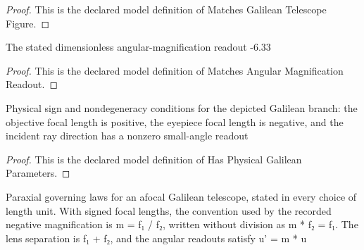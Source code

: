 \begin{proof}
  This is the declared model definition of Matches Galilean Telescope Figure.
\end{proof}
\begin{definition}
  \label{def:physics:phyx-mini-0111:phyxminiproblems-problemphyxmini0111-matchesangularmagnificationreadout}
  The stated dimensionless angular-magnification readout -6.33
\end{definition}
\begin{proof}
  This is the declared model definition of Matches Angular Magnification Readout.
\end{proof}
\begin{definition}
  \label{def:physics:phyx-mini-0111:phyxminiproblems-problemphyxmini0111-hasphysicalgalileanparameters}
  Physical sign and nondegeneracy conditions for the depicted Galilean branch: the objective focal length is positive, the eyepiece focal length is negative, and the incident ray direction has a nonzero small-angle readout
\end{definition}
\begin{proof}
  This is the declared model definition of Has Physical Galilean Parameters.
\end{proof}
\begin{definition}
  \label{def:physics:phyx-mini-0111:phyxminiproblems-problemphyxmini0111-satisfiesafocalgalileanlaws}
  Paraxial governing laws for an afocal Galilean telescope, stated in every choice of length unit. With signed focal lengths, the convention used by the recorded negative magnification is m = f₁ / f₂, written without division as m * f₂ = f₁. The lens separation is f₁ + f₂, and the angular readouts satisfy u' = m * u
\end{definition}
